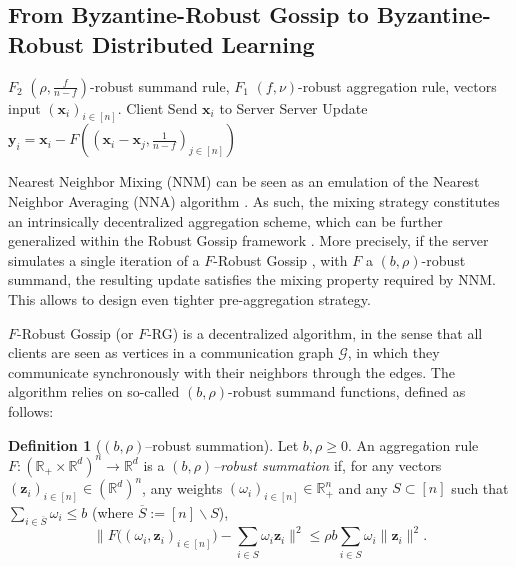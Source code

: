 \documentclass{article}
\def\vx{{\bm{x}}}
\def\vy{{\bm{y}}}
\def\vz{{\bm{z}}}
\newcommand{\R}{\mathbb{R}}
\newcommand{\cG}{\mathcal{G}}
\theoremstyle{plain}
\theoremstyle{definition}
\newtheorem{definition}[theorem]{Definition}
\theoremstyle{remark}
\begin{document}
\subsection{From Byzantine-Robust Gossip to Byzantine-Robust Distributed Learning}
\label{app:sec:robst_gossip_to_robust_mixing}
\begin{algorithm}[h]
  \caption{Robust-Gossip based Pre-Aggregation}
  \label{app:alg:F_RG_preaggregation}
  \begin{algorithmic}
     $F_2$ $(\rho, \frac{f}{n-f})$-robust summand rule, $F_1$ $(f,\nu)$-robust aggregation rule, vectors input $(\vx_i)_{i\in [n]}$.
     \STATE Client Send $\vx_i$ to Server
    \ENDFOR
    \STATE Server Update $\vy_i = \vx_i - F( (\vx_i - \vx_j, \frac{1}{n-f})_{j\in [n]})$
  \end{algorithmic}
\end{algorithm}


Nearest Neighbor Mixing (NNM) can be seen as an emulation of the Nearest Neighbor Averaging (NNA) algorithm \citep{farhadkhani2023robust}. As such, the mixing strategy constitutes an intrinsically decentralized aggregation scheme, which can be further generalized within the Robust Gossip framework \citep{gaucher2025unified}. 
More precisely, if the server simulates a single iteration of a $F$-Robust Gossip \citep{gaucher2025unified}, with $F$ a $(b,\rho)$-robust summand, the resulting update satisfies the mixing property required by NNM. This allows to design even tighter pre-aggregation strategy. 


$F$-Robust Gossip (or $F$-RG) is a decentralized algorithm, in the sense that all clients are seen as vertices in a communication graph $\cG$, in which they communicate synchronously with their neighbors through the edges. The algorithm relies on so-called $(b,\rho)$-robust summand functions, defined as follows:

\begin{definition}[$(b,\rho)$--robust summation] Let $b, \rho \ge 0$. An aggregation rule $F:(\R_+ \times \R^d)^n \rightarrow \R^d$ is a \emph{$(b, \rho)$--robust summation} if, for any vectors $(\vz_i)_{i \in [n]}\in (\R^d)^n$, any weights $(\omega_i)_{i \in [n]} \in \R_+^n$ and any $S \subset [n]$ such that $\sum_{i \in \overline{S}} \omega_i \le b$ (where $\overline{S} := [n]\backslash S$),
\[
\bigg\|F\big((\omega_i, \vz_i)_{i \in [n]}\big) - \sum_{i\in S} \omega_i \vz_i\bigg\|^2 \le \rho b \sum_{i\in S} \omega_i \|\vz_i\|^2.
\]
\end{definition}
\end{document}
